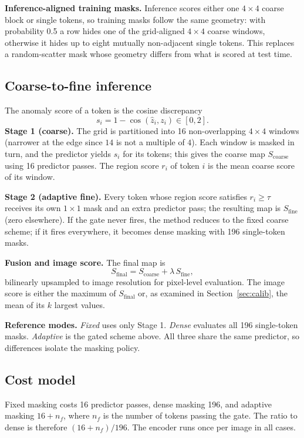 \documentclass[conference]{IEEEtran}
\newcommand{\Scoarse}{S_{\mathrm{coarse}}}
\newcommand{\Sfine}{S_{\mathrm{fine}}}
\newcommand{\Sfinal}{S_{\mathrm{final}}}
\begin{document}
\textbf{Inference-aligned training masks.} Inference scores either one $4\times4$ coarse block or single tokens, so training masks follow the same geometry: with probability 0.5 a row hides one of the grid-aligned $4\times4$ coarse windows, otherwise it hides up to eight mutually non-adjacent single tokens. This replaces a random-scatter mask whose geometry differs from what is scored at test time.

\subsection{Coarse-to-fine inference}
The anomaly score of a token is the cosine discrepancy
\begin{equation}
s_i = 1-\cos(\hat z_i, z_i)\in[0,2].
\end{equation}
\textbf{Stage 1 (coarse).} The grid is partitioned into 16 non-overlapping $4\times4$ windows (narrower at the edge since $14$ is not a multiple of $4$). Each window is masked in turn, and the predictor yields $s_i$ for its tokens; this gives the coarse map $\Scoarse$ using 16 predictor passes. The region score $r_i$ of token $i$ is the mean coarse score of its window.

\textbf{Stage 2 (adaptive fine).} Every token whose region score satisfies $r_i\ge\tau$ receives its own $1\times1$ mask and an extra predictor pass; the resulting map is $\Sfine$ (zero elsewhere). If the gate never fires, the method reduces to the fixed coarse scheme; if it fires everywhere, it becomes dense masking with 196 single-token masks.

\textbf{Fusion and image score.} The final map is
\begin{equation}
\Sfinal=\Scoarse+\lambda\,\Sfine,
\label{eq:fuse}
\end{equation}
bilinearly upsampled to image resolution for pixel-level evaluation. The image score is either the maximum of $\Sfinal$ or, as examined in Section~\ref{sec:calib}, the mean of its $k$ largest values.

\textbf{Reference modes.} \emph{Fixed} uses only Stage 1. \emph{Dense} evaluates all 196 single-token masks. \emph{Adaptive} is the gated scheme above. All three share the same predictor, so differences isolate the masking policy.

\subsection{Cost model}
Fixed masking costs 16 predictor passes, dense masking 196, and adaptive masking $16+n_f$, where $n_f$ is the number of tokens passing the gate. The ratio to dense is therefore $(16+n_f)/196$. The encoder runs once per image in all cases.
\end{document}
